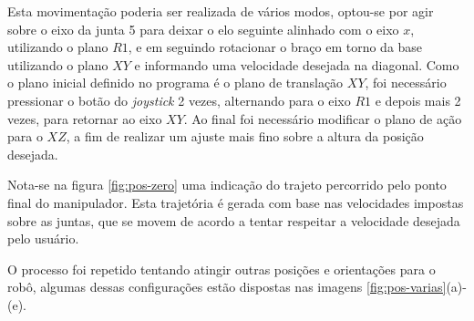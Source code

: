 Esta movimentação poderia ser realizada de vários modos, optou-se por agir sobre o eixo
da junta 5 para deixar o elo seguinte alinhado com o eixo $x$, utilizando o plano $R1$, e em 
seguindo rotacionar o braço em torno da base utilizando o plano $XY$ e informando uma velocidade
desejada na diagonal. Como o plano inicial definido no programa é o plano de translação $XY$,
foi necessário pressionar o botão do \textit{joystick} 2 vezes, alternando para o eixo $R1$ e depois mais
2 vezes, para retornar ao eixo $XY$. Ao final foi necessário modificar o plano de ação para o $XZ$, 
a fim de realizar um ajuste mais fino sobre a altura da posição desejada.

Nota-se na figura \ref{fig:pos-zero} uma indicação do trajeto percorrido pelo ponto final do 
manipulador. Esta trajetória é gerada com base nas velocidades impostas sobre as juntas, que 
se movem de acordo a tentar respeitar a velocidade desejada pelo usuário.

O processo foi repetido tentando atingir outras posições e orientações para o robô, algumas dessas
configurações estão dispostas nas imagens \ref{fig:pos-varias}(a)-(e).

